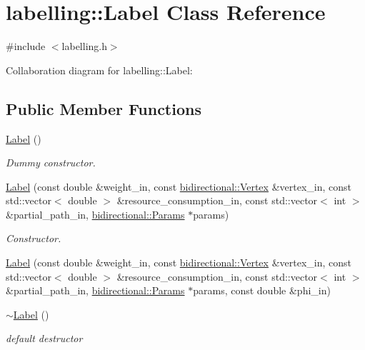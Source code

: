 \hypertarget{classlabelling_1_1Label}{}\section{labelling\+:\+:Label Class Reference}
\label{classlabelling_1_1Label}


{\ttfamily \#include $<$labelling.\+h$>$}



Collaboration diagram for labelling\+:\+:Label\+:
\subsection*{Public Member Functions}
\begin{DoxyCompactItemize}
\item 
\hyperlink{classlabelling_1_1Label_a3728b76c8b32589e04ecaac821f11733}{Label} ()
\begin{DoxyCompactList}\small\item\em Dummy constructor. \end{DoxyCompactList}\item 
\hyperlink{classlabelling_1_1Label_a6861a92f1825ed3bb9ea46515cdf1d16}{Label} (const double \&weight\+\_\+in, const \hyperlink{structbidirectional_1_1Vertex}{bidirectional\+::\+Vertex} \&vertex\+\_\+in, const std\+::vector$<$ double $>$ \&resource\+\_\+consumption\+\_\+in, const std\+::vector$<$ int $>$ \&partial\+\_\+path\+\_\+in, \hyperlink{classbidirectional_1_1Params}{bidirectional\+::\+Params} $\ast$params)
\begin{DoxyCompactList}\small\item\em Constructor. \end{DoxyCompactList}\item 
\hyperlink{classlabelling_1_1Label_a255f1384159b9748980f824eb1ddb5f8}{Label} (const double \&weight\+\_\+in, const \hyperlink{structbidirectional_1_1Vertex}{bidirectional\+::\+Vertex} \&vertex\+\_\+in, const std\+::vector$<$ double $>$ \&resource\+\_\+consumption\+\_\+in, const std\+::vector$<$ int $>$ \&partial\+\_\+path\+\_\+in, \hyperlink{classbidirectional_1_1Params}{bidirectional\+::\+Params} $\ast$params, const double \&phi\+\_\+in)
\item 
\hyperlink{classlabelling_1_1Label_a72d8b0e24b8dbacc1ecb40b3c32265e2}{$\sim$\+Label} ()
\begin{DoxyCompactList}\small\item\em default destructor \end{DoxyCompactList}\item 

\end{DoxyCompactItemize}
